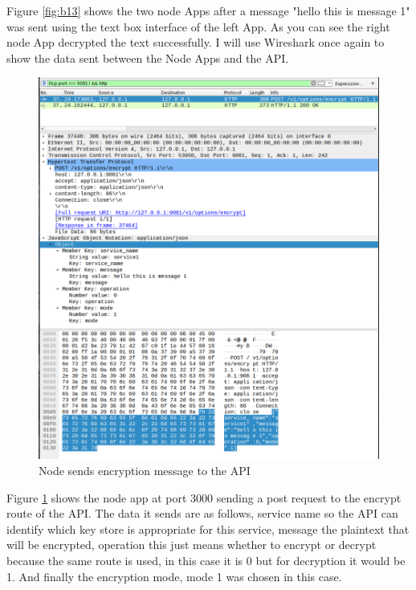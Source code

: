 Figure \ref{fig:b13} shows the two node Apps after a message "hello this is message 1" was sent using the text box interface of the left App. As you can see the right node App decrypted the text successfully.
I will use Wireshark once again to show the data sent between the Node Apps and the API.

\begin{figure}[!h]
  \centering
      \includegraphics[width=1\textwidth]{Figures/b11.png}
  \caption[Node sends encryption message to the API ]{Node sends encryption message to the API}
  \label{fig:b11}
\end{figure}
\FloatBarrier
Figure \ref{fig:b11} shows the node app at port 3000 sending a post request to the encrypt route of the API.
The data it sends are as follows, service name so the API can identify which key store is appropriate for this service, message the plaintext that will be encrypted, operation this just means whether to encrypt or decrypt because the same route is used, in this case it is 0 but for decryption it would be 1. And finally the encryption mode, mode 1 was chosen in this case.

